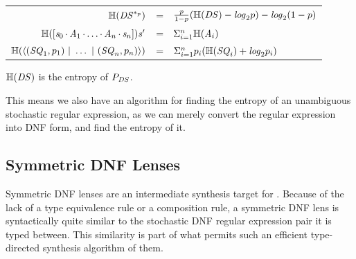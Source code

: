 \documentclass[acmsmall,screen,anonymous]{acmart}
\begin{document}
\begin{center}
  \begin{tabular}{rcl}
    $\mathbb{H}(\mathit{DS}^{*_{p}})$
    & =
    & $\frac{p}{1-p}(\mathbb{H}(\mathit{DS}) - \mathit{log}_2p)
      - \mathit{log}_2(1-p)
      $\\
    
    $\mathbb{H}([\mathit{s}_0 \mkern-1mu\cdot\mkern-1mu \mathit{A}_1 \mkern-1mu\cdot\mkern-1mu \ldots \mkern-1mu\cdot\mkern-1mu \mathit{A}_n \mkern-1mu\cdot\mkern-1mu \mathit{s}_n]){\mathit{s}'}$
    & =
    & $\Sigma_{i = 1}^n\mathbb{H}(\mathit{A}_i)$ \\
    
    $\mathbb{H}(\langle(\mathit{SQ}_1,p_1) ~|~ \ldots ~|~ (\mathit{SQ}_n,p_n)\rangle)$
    & =
    & $\Sigma_{i=1}^np_i(\mathbb{H}(\mathit{SQ}_i)+\mathit{log}_2p_i)$\\
  \end{tabular}
\end{center}

\begin{theorem}
  $\mathbb{H}(\mathit{DS})$ is the entropy of $P_{\mathit{DS}}$.
\end{theorem}

This means we also have an algorithm for finding the entropy of an unambiguous
stochastic regular expression, as we can merely convert the regular expression
into DNF form, and find the entropy of it.

\subsection{Symmetric DNF Lenses}
Symmetric DNF lenses are an intermediate synthesis target for \GreedySynth.
Because of the lack of a type equivalence rule or a composition rule, a
symmetric DNF lens is syntactically quite similar to the stochastic DNF regular
expression pair it is typed between. This similarity is part of what permits
such an efficient type-directed synthesis algorithm of them.
\end{document}

